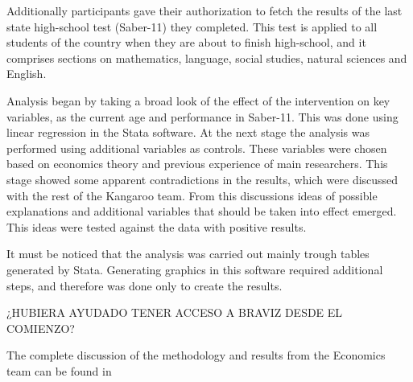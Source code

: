 Additionally participants gave their authorization to fetch the results of the last state high-school test (Saber-11) they completed. This test is applied to all students of the country when they are about to finish high-school, and it comprises sections on mathematics, language, social studies, natural sciences and English.

Analysis began by taking a broad look of the effect of the intervention on key variables, as the current age and performance in Saber-11. This was done using linear regression in the Stata software. At the next stage the analysis was performed using additional variables as controls. These variables were chosen based on economics theory and previous experience of main researchers. This stage showed some apparent contradictions in the results, which were discussed with the rest of the Kangaroo team. From this discussions ideas of possible explanations and additional variables that should be taken into effect emerged. This ideas were tested against the data with positive results. 

It must be noticed that the analysis was carried out mainly trough tables generated by Stata. Generating graphics in this software required additional steps, and therefore was done only to create the results.

¿HUBIERA AYUDADO TENER ACCESO A BRAVIZ DESDE EL COMIENZO?


The complete discussion of the methodology and results from the Economics team can be found in \autocite{?}




